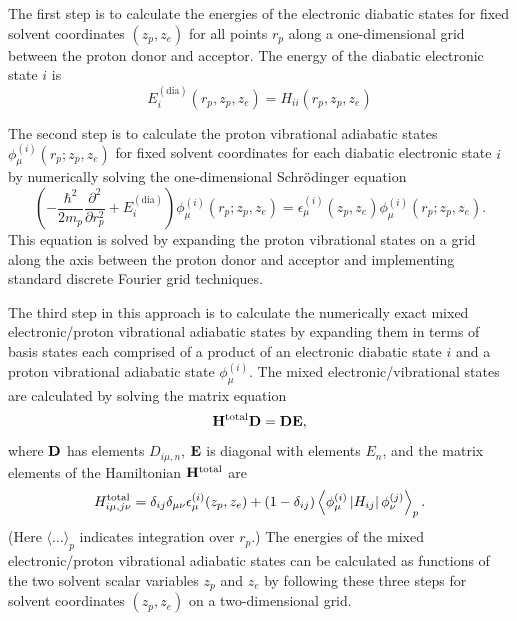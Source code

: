 \documentclass[oneside,11pt,openany]{book}
\begin{document}
The first step is to
calculate the energies of the electronic diabatic states for fixed
solvent coordinates $(z_p,z_e)$ 
for all points $r_p$ along a one-dimensional grid
between the proton donor and acceptor.  The energy of the diabatic
electronic state $i$ is 
%
\begin{equation}
E_i^{\mathrm{(dia)}}(r_p,z_p,z_e)=H_{ii}(r_p,z_p,z_e)
\end{equation}
\par
The second step is to calculate the proton vibrational
adiabatic states $\phi_\mu^{(i)}(r_p;z_p,z_e)$ for
fixed solvent coordinates for each diabatic electronic state $i$
by numerically solving the one-dimensional Schr\"odinger equation
%
\begin{equation}
\left( -\frac{\hbar^2}{2m_p}\frac{\partial^2}{\partial r_p^2}
+E_i^{\mathrm{(dia)}}\right)
\phi_\mu^{(i)}(r_p;z_p,z_e)=\epsilon_\mu^{(i)}(z_p,z_e)
\phi_\mu^{(i)}(r_p;z_p,z_e).
\end{equation}
%
This equation is solved
by expanding the proton vibrational states 
on a grid along the axis between the
proton donor and acceptor and implementing standard discrete
Fourier grid techniques.
\par
The third step in this approach is to calculate the 
numerically exact mixed electronic/proton
vibrational adiabatic states by expanding them in terms of
basis states each comprised of a product of an electronic diabatic state $i$
and a proton vibrational adiabatic state $\phi_\mu^{(i)}$.
The mixed electronic/vibrational states are calculated by
solving the matrix equation
%
\begin{equation}
{\bf H}^{\rm total} {\bf D}={\bf D}{\bf E},
\end{equation}
%
where ${\bf D}$ has elements $D_{i\mu,n}$, ${\bf E}$ is diagonal with
elements $E_{n}$, and
the matrix elements of the Hamiltonian ${\bf H}^{\rm total}$ are
%
\begin{equation}
H_{i\mu,j\nu}^{\rm total} =
\delta_{ij}\delta_{\mu\nu}\epsilon_\mu^{(i)}(z_p,z_e)+
(1-\delta_{ij})\left\langle \phi_\mu^{(i)}\left|
{H}_{ij}\right|\phi_\nu^{(j)}\right\rangle_p .
\label{eq.hinjmd}
\end{equation}
%
(Here $\langle \ldots \rangle_p$ indicates integration over $r_p$.)
The energies of the mixed electronic/proton vibrational
adiabatic states can be calculated
as functions of the two solvent scalar variables $z_p$ and $z_e$
by following these three steps for solvent coordinates $(z_p,z_e)$
on a two-dimensional grid.
\end{document}
